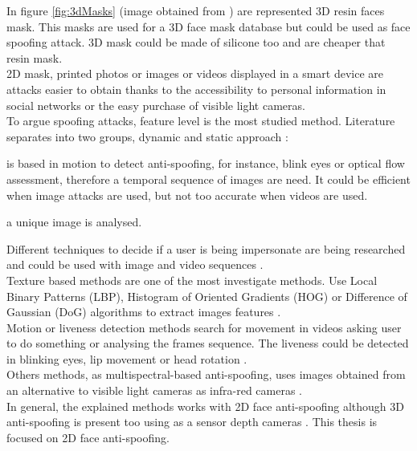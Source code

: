 In figure \ref{fig:3dMasks} (image obtained from \cite{3dmask}) are represented 3D resin faces mask. This masks are used for a 3D face mask database but could be used as face spoofing attack. 3D mask could be made of silicone too and are cheaper that resin mask.\\

2D mask, printed photos or images or videos displayed in a smart device are attacks easier to obtain thanks to the accessibility to personal information in social networks or the easy purchase of visible light cameras.\\

To argue spoofing attacks, feature level is the most studied method. Literature separates into two groups, dynamic and static approach \cite{Spoofing_survey}:
\begin{description}[noitemsep,topsep=8pt,parsep=0pt,partopsep=20pt]
\item[Dynamic:] is based in motion to detect anti-spoofing, for instance, blink eyes or optical flow assessment, therefore a temporal sequence of images are need. It could be efficient when image attacks are used, but not too accurate when videos are used. 
\item[Static:] a unique image is analysed.
\end{description}

Different techniques to decide if a user is being impersonate are being researched and could be used with image and video sequences \cite{Spoofing_survey}.\\

Texture based methods are one of the most investigate methods. Use Local Binary Patterns (LBP),  Histogram of Oriented Gradients (HOG) or Difference of Gaussian (DoG) algorithms to extract images features \cite{distorsion,Spoofing_survey}.\\

Motion or liveness detection methods search for movement in videos asking user to do something or analysing the frames sequence. The liveness could be detected in blinking eyes, lip movement or head rotation \cite{distorsion,Spoofing_survey}.\\

Others methods, as multispectral-based anti-spoofing, uses images obtained from an alternative to visible light cameras as infra-red cameras \cite{distorsion}.\\

In general, the explained methods works with 2D face anti-spoofing although 3D anti-spoofing is present too using as a sensor depth cameras \cite{2d_3d_face}. This thesis is focused on 2D face anti-spoofing.\\